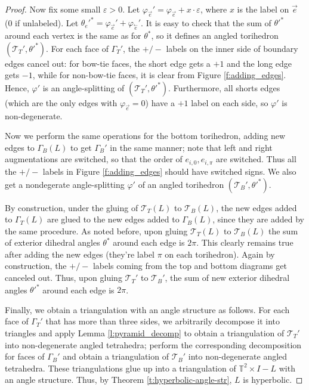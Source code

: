 \documentclass[11pt]{amsart}
\newcommand{\thmref}[1]{Theorem \ref{#1}}
\newcommand{\lemref}[1]{Lemma \ref{#1}}
\newcommand{\figref}[1]{Figure \ref{#1}}
\newcommand{\torus}{{\mathbb{T}^2}}
\newcommand{\sT}{{\mathcal{T}}}
\newcommand{\cev}[1]{\overset{\leftarrow}{#1}}
\newcommand{\vphi}{\varphi}
\newcommand{\veps}{\varepsilon}
\newcommand{\toruscomp}[1]{{\torus \times I - #1}}
\theoremstyle{plain}
\theoremstyle{definition}
\begin{document}
\begin{proof}
Now fix some small $\veps > 0$.
Let $\vphi_{\vec{e}}' = \vphi_{\vec{e}} + x \cdot \veps$,
where $x$ is the label on $\vec{e}$ (0 if unlabeled).
Let $\theta_e'^* = \vphi_{\vec{e}}' + \vphi_{\cev{e}}'$.
It is easy to check that the sum of $\theta'^*$
around each vertex is the same as for $\theta^*$,
so it defines an angled torihedron $(\sT_T',\theta'^*)$.
For each face of $\Gamma_T'$, the $+/-$ labels
on the inner side of boundary edges cancel out:
for bow-tie faces, the short edge gets a $+1$ and the long edge
gets $-1$, while for non-bow-tie faces,
it is clear from \figref{f:adding_edges}.
Hence, $\vphi'$ is an angle-splitting of $(\sT_T',\theta'^*)$.
Furthermore, all shorts edges
(which are the only edges with $\vphi_{\vec{e}} = 0$)
have a $+1$ label on each side,
so $\vphi'$ is non-degenerate.


Now we perform the same operations for the bottom torihedron,
adding new edges to $\Gamma_B(L)$ to get $\Gamma_B'$
in the same manner;
note that left and right augmentations are switched,
so that the order of $e_{i,0},e_{i,\pi}$ are switched.
Thus all the $+/-$ labels in \figref{f:adding_edges}
should have switched signs.
We also get a nondegerate angle-splitting $\vphi'$
of an angled torihedron $(\sT_B',\theta'^*)$.


By construction, under the gluing of
$\sT_T(L)$ to $\sT_B(L)$,
the new edges added to $\Gamma_T(L)$
are glued to the new edges added to $\Gamma_B(L)$,
since they are added by the same procedure.
As noted before, upon gluing $\sT_T(L)$ to $\sT_B(L)$
the sum of exterior dihedral angles $\theta^*$ around each edge
is $2\pi$.
This clearly remains true after adding the new edges
(they're label $\pi$ on each torihedron).
Again by construction,
the $+/-$ labels coming from the top and bottom diagrams get canceled out.
Thus, upon gluing $\sT_T'$ to $\sT_B'$,
the sum of new exterior dihedral angles $\theta'^*$ around each edge
is $2\pi$.


Finally, we obtain a triangulation with an angle structure as follows.
For each face of $\Gamma_T'$ that has more than three sides,
we arbitrarily decompose it into triangles
and apply \lemref{l:pyramid_decomp}
to obtain a triangulation of $\sT_T'$ into non-degenerate angled tetrahedra;
perform the corresponding decomposition for faces of
$\Gamma_B'$ and obtain a triangulation of $\sT_B'$
into non-degenerate angled tetrahedra.
These triangulations glue up into a triangulation of $\toruscomp{L}$
with an angle structure.
Thus, by \thmref{t:hyperbolic-angle-str},
$L$ is hyperbolic.
\end{proof}





\end{document}
